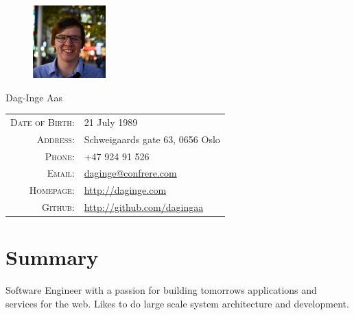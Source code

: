 \documentclass[a4paper,10pt]{article}
\begin{document}
\pagestyle{empty}
  \begin{figure}
  \includegraphics[width=0.25\textwidth]{profile.jpg}
  \end{figure}
\par{
  {\Huge Dag-Inge Aas }
  \bigskip\par}

  \begin{tabular}{rl}
  \textsc{Date of Birth:} & 21 July 1989\\
    \textsc{Address:}& Schweigaards gate 63, 0656 Oslo\\
    \textsc{Phone:}& +47 924 91 526\\
    \textsc{Email:}& \href{mailto:daginge@confrere.com}{daginge@confrere.com}\\
    \textsc{Homepage:}& \href{http://daginge.com}{http://daginge.com}\\
    \textsc{Github:}& \href{http://github.com/dagingaa}{http://github.com/dagingaa}\\
\end{tabular}

\section{Summary}
\par{
Software Engineer with a passion for building tomorrows applications and services for the web. Likes to do large
scale system architecture and development. }
\end{document}
